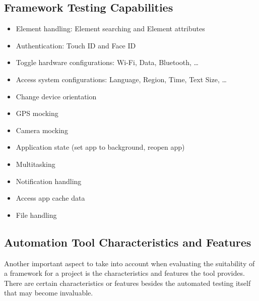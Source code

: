 \subsection {Framework Testing Capabilities}
	\begin{itemize}
  		\vspace{-0.4cm}\item Element handling: Element searching and Element attributes
		\vspace{-0.4cm}\item Authentication: Touch ID and Face ID
		\vspace{-0.4cm}\item Toggle hardware configurations: Wi-Fi, Data, Bluetooth, …
		\vspace{-0.4cm}\item Access system configurations: Language, Region, Time, Text Size, …
		\vspace{-0.4cm}\item Change device orientation
		\vspace{-0.4cm}\item GPS mocking
		\vspace{-0.4cm}\item Camera mocking
		\vspace{-0.4cm}\item Application state (set app to background, reopen app)
		\vspace{-0.4cm}\item Multitasking
		\vspace{-0.4cm}\item Notification handling
		\vspace{-0.4cm}\item Access app cache  data
		\vspace{-0.4cm}\item File handling
	\end{itemize}
	
\subsection {Automation Tool Characteristics and Features}

Another important aspect to take into account when evaluating the suitability of a framework for a project is the characteristics and features the tool provides. There are certain characteristics or features besides the automated testing itself that may become invaluable. 

